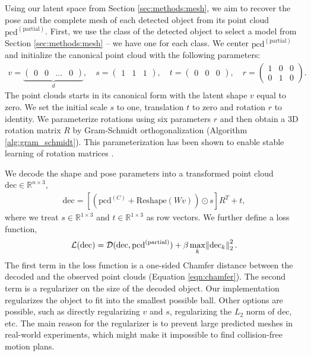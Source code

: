 \documentclass{article}
\newcommand{\pcx}[1]{\mathrm{pcd}^{(#1)}}
\newcommand{\pcc}{\pcx{C}}
\begin{document}
Using our latent space from Section \ref{sec:methods:mesh}, we aim to recover the pose and the complete mesh of each detected object from its point cloud $\mathrm{pcd}^{\mathrm{(partial)}}$. First, we use the class of the detected object to select a model from Section \ref{sec:methods:mesh} -- we have one for each class. We center $\mathrm{pcd}^{\mathrm{(partial)}}$ and initialize the canonical point cloud with the following parameters:
\begin{align}
    v = \underbrace{\begin{pmatrix} 0 & 0 & ... & 0 \end{pmatrix}}_d,\quad s = \begin{pmatrix} 1 & 1 & 1 \end{pmatrix},\quad t = \begin{pmatrix} 0 & 0 & 0 \end{pmatrix},\quad r = \begin{pmatrix} 1 & 0 & 0 \\ 0 & 1 & 0 \end{pmatrix}.
\end{align}
The point clouds starts in its canonical form with the latent shape $v$ equal to zero. We set the initial scale $s$ to one, translation $t$ to zero and 
rotation $r$ to identity. We parameterize rotations using six parameters $r$ and then obtain a 3D rotation matrix $R$ by Gram-Schmidt orthogonalization (Algorithm \ref{alg:gram_schmidt}). This parameterization has been shown to enable stable learning of rotation matrices \cite{falorsi18explorations, park22learning}.

We decode the shape and pose parameters into a transformed point cloud $\mathrm{dec} \in \mathbb{R}^{n \times 3}$,
\begin{align}
    \mathrm{dec} = [(\pcc + \mathrm{Reshape}(W v)) \odot s] R^T + t,
    \label{eq:dec}
\end{align}
where we treat $s \in \mathbb{R}^{1 \times 3}$ and $t \in \mathbb{R}^{1 \times 3}$ as row vectors.
We further define a loss function,
\begin{align}
    \mathcal{L}(\mathrm{dec}) = \mathcal{D}(\mathrm{dec}, \mathrm{pcd}^{\mathrm{(partial)}}) + \beta \max_k \norm{\mathrm{dec}_k}_2^2.
\end{align}
The first term in the loss function is a one-sided Chamfer distance between the decoded and the observed point clouds (Equation \ref{eqn:chamfer}). The second term is a regularizer on the size of the decoded object. Our implementation regularizes the object to fit into the smallest possible ball. Other options are possible, such as directly regularizing $v$ and $s$, regularizing the $L_2$ norm of $\mathrm{dec}$, etc. The main reason for the regularizer is to prevent large predicted meshes in real-world experiments, which might make it impossible to find collision-free motion plans.
\end{document}
